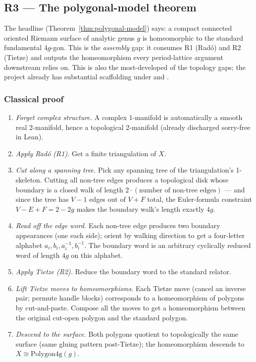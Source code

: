 \subsection{R3 --- The polygonal-model theorem}
\label{subsec:gap-R3-polygonal-model}

The headline (Theorem~\ref{thm:polygonal-model}) says: a compact
connected oriented Riemann surface of analytic genus \(g\) is
homeomorphic to the standard fundamental \(4g\)-gon.  This is the
\emph{assembly} gap: it consumes R1 (Rad\'o) and R2 (Tietze) and outputs
the homeomorphism every period-lattice argument downstream relies on.
This is also the most-developed of the topology gaps; the project
already has substantial scaffolding under 
and .

\subsubsection*{Classical proof}

\begin{enumerate}
\item \emph{Forget complex structure.}  A complex 1-manifold is
  automatically a smooth real 2-manifold, hence a topological
  2-manifold (already discharged sorry-free in Lean).
\item \emph{Apply Rad\'o (R1).}  Get a finite triangulation of \(X\).
\item \emph{Cut along a spanning tree.}  Pick any spanning tree of
  the triangulation's 1-skeleton.  Cutting all non-tree edges
  produces a topological disk whose boundary is a closed walk of
  length \(2 \cdot (\text{number of non-tree edges})\) --- and since
  the tree has \(V - 1\) edges out of \(V + F\) total, the
  Euler-formula constraint \(V - E + F = 2 - 2g\) makes the
  boundary walk's length exactly \(4g\).
\item \emph{Read off the edge word.}  Each non-tree edge produces
  two boundary appearances (one each side); orient by walking
  direction to get a four-letter alphabet \(a_i, b_i, a_i^{-1},
  b_i^{-1}\).  The boundary word is an arbitrary cyclically reduced
  word of length \(4g\) on this alphabet.
\item \emph{Apply Tietze (R2).}  Reduce the boundary word to the
  standard relator.
\item \emph{Lift Tietze moves to homeomorphisms.}  Each Tietze
  move (cancel an inverse pair; permute handle blocks) corresponds
  to a homeomorphism of polygons by cut-and-paste.  Compose all the
  moves to get a homeomorphism between the original cut-open polygon
  and the standard polygon.
\item \emph{Descend to the surface.}  Both polygons quotient to
  topologically the same surface (same gluing pattern post-Tietze);
  the homeomorphism descends to \(X \cong \mathrm{Polygon4g}(g)\).
\end{enumerate}

